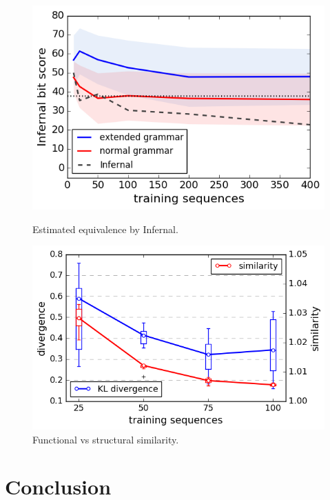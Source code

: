 \documentclass[a4paper]{esannV2}
\begin{document}
\begin{figure}[ht]
      \centering
  \begin{minipage}[b]{0.46\textwidth}
    \includegraphics[width=\textwidth]{images/infernal.png}
    \caption{Estimated equivalence by Infernal.}
      \label{infeval}
  \end{minipage}
  \hfill
  \begin{minipage}[b]{0.51\textwidth}
    \includegraphics[width=\textwidth]{images/learningcurve.png}
    \caption{Functional vs structural similarity.}
     \label{learncurve}
  \end{minipage}
\end{figure}

 
\section{Conclusion}
\end{document}
